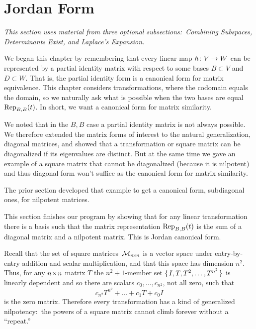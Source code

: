 \section{Jordan Form}
\noindent\textit{This section uses material from three optional
subsections:~Combining Subspaces, Determinants Exist, and
Laplace's Expansion.}

We began this chapter
by remembering that every linear map $\map{h}{V}{W}$ can
be represented by a partial identity matrix with respect to some
bases $B\subset V$ and $D\subset W$.
That is, the partial identity form is a canonical form for 
matrix equivalence. 
This chapter considers transformations, where
the codomain equals the domain, so 
we naturally ask what is possible when the
two bases are equal $\rep{t}{B,B}$.
In short, we want a canonical form for matrix similarity.

We noted that in the $B,B$ case
a partial identity matrix is not always possible.
We therefore extended the matrix 
forms of interest to the natural generalization, 
diagonal matrices, and
showed that a transformation or square matrix can be diagonalized
if its eigenvalues are distinct.
But at the same time we gave an example of a 
square matrix that cannot be diagonalized
(because it is nilpotent)
and thus diagonal form won't suffice as the canonical form 
for matrix similarity. 

The prior section developed that example
to get a canonical form, subdiagonal ones, for nilpotent matrices.

This section finishes our program by
showing that for any linear transformation there is
a basis such that the matrix representation $\rep{t}{B,B}$ is the sum of a 
diagonal matrix and a nilpotent matrix.
This is Jordan canonical form.









Recall that the set of square matrices~\( \matspace_{\nbyn{n}} \)
is a vector space under entry-by-entry addition and scalar multiplication,
and that 
this space has dimension \( n^2 \).
Thus, for any \( \nbyn{n} \) matrix $T$ the
\( n^2+1 \)-member set \( \set{I,T,T^2,\dots,T^{n^2} } \) is linearly
dependent and so there are scalars \( c_0,\dots,c_{n^2} \),
not all zero, such that
\begin{equation*}
  c_{n^2}T^{n^2}+\dots+c_1T+c_0I
\end{equation*}
is the zero matrix.
Therefore every transformation has a kind of generalized 
nilpotency:~the powers
of a square matrix cannot climb forever without a ``repeat.''

